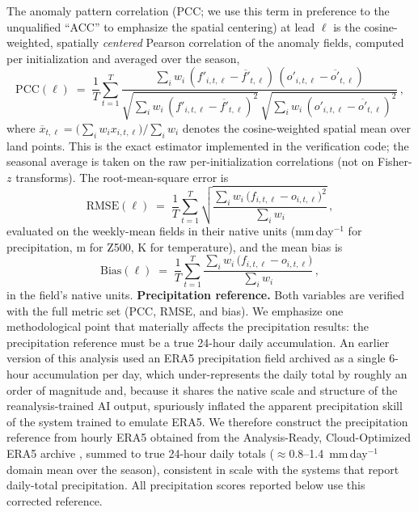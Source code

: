 \documentclass[11pt]{article}
\begin{document}
The anomaly pattern correlation (PCC; we use this term in preference to
the unqualified ``ACC'' to emphasize the spatial centering) at lead
$\ell$ is the cosine-weighted, spatially \emph{centered} Pearson
correlation of the anomaly fields, computed per initialization and
averaged over the season,
\begin{equation}
  \mathrm{PCC}(\ell) \;=\; \frac{1}{T}\sum_{t=1}^{T}
  \frac{\sum_i w_i\,(f'_{i,t,\ell}-\overline{f'}_{t,\ell})\,
                     (o'_{i,t,\ell}-\overline{o'}_{t,\ell})}
       {\sqrt{\sum_i w_i\,(f'_{i,t,\ell}-\overline{f'}_{t,\ell})^{2}}\,
        \sqrt{\sum_i w_i\,(o'_{i,t,\ell}-\overline{o'}_{t,\ell})^{2}}}\,,
  \label{eq:acc}
\end{equation}
where $\overline{x}_{t,\ell}=\big(\sum_i w_i x_{i,t,\ell}\big)/\sum_i w_i$
denotes the cosine-weighted spatial mean over land points. This is the
exact estimator implemented in the verification code; the seasonal
average is taken on the raw per-initialization correlations (not on
Fisher-$z$ transforms). The root-mean-square error is
\begin{equation}
  \mathrm{RMSE}(\ell) \;=\; \frac{1}{T}\sum_{t=1}^{T}
  \sqrt{\frac{\sum_i w_i\,\bigl(f_{i,t,\ell}-o_{i,t,\ell}\bigr)^{2}}
             {\sum_i w_i}}\,,
  \label{eq:rmse}
\end{equation}
evaluated on the weekly-mean fields in their native units
(mm\,day$^{-1}$ for precipitation, m for Z500, K for temperature), and
the mean bias is
\begin{equation}
  \mathrm{Bias}(\ell) \;=\; \frac{1}{T}\sum_{t=1}^{T}
  \frac{\sum_i w_i\,\bigl(f_{i,t,\ell}-o_{i,t,\ell}\bigr)}
       {\sum_i w_i}\,,
  \label{eq:bias}
\end{equation}
in the field's native units. \textbf{Precipitation reference.} Both
variables are verified with the full metric set (PCC, RMSE, and bias).
We emphasize one methodological point that materially affects the
precipitation results: the precipitation reference must be a true
24-hour daily accumulation. An earlier version of this analysis used an
ERA5 precipitation field archived as a single 6-hour accumulation per
day, which under-represents the daily total by roughly an order of
magnitude and, because it shares the native scale and structure of the
reanalysis-trained AI output, spuriously inflated the apparent
precipitation skill of the system trained to emulate ERA5. We therefore
construct the precipitation reference from hourly ERA5 obtained from the
Analysis-Ready, Cloud-Optimized ERA5 archive
\citep[ARCO-ERA5;][]{carver2023}, summed to true 24-hour daily totals
($\approx$0.8--1.4~mm\,day$^{-1}$ domain mean over the season),
consistent in scale with the systems that report daily-total
precipitation. All precipitation scores reported below use this
corrected reference.
\end{document}
